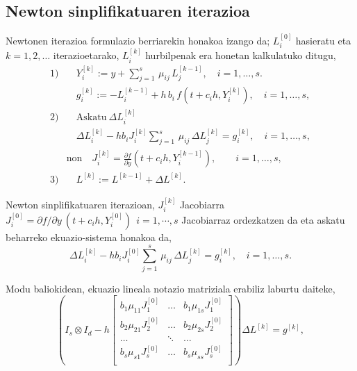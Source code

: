 \subsection*{Newton sinplifikatuaren iterazioa}

Newtonen iterazioa formulazio berriarekin honakoa izango da; $L_i^{[0]}$ hasieratu eta  $k=1,2,\dots$ iterazioetarako, $L_i^{[k]}$ hurbilpenak era honetan kalkulatuko ditugu,
\begin{equation}
\label{eq:Newton_iteration2}
\begin{split}
1) 
   & \quad Y_i^{[k]} := y+\sum_{j=1}^{s}\, \mu_{ij}\, L_{j}^{[k-1]}, \quad  i=1 ,\ldots, s. \\
   & \quad g_i^{[k]} := -L_{i}^{[k-1]}  + h \, b_i\, f(t+c_i h,  Y_i^{[k]}), \quad  i=1 ,\ldots, s, \\   
2) & \quad \mathrm{Askatu \ } \Delta L_{i}^{[k]}  \\
   & \quad \Delta L_{i}^{[k]}  - h b_i J_i^{[k]} \sum_{j=1}^{s}\, \mu_{ij} \, \Delta L_{j}^{[k]}=g_i^{[k]}, \quad  i=1 ,\ldots, s,  \\
& \mbox{non} \quad  J_i^{[k]}=\frac{\partial f}{\partial y}(t + c_i h,Y_{i}^{[k-1]}),\quad \quad  i=1,\ldots, s,  \\
3) 
   & \quad   L^{[k]} := L^{[k-1]}  + \Delta L^{[k]}.
   \end{split}
\end{equation}

Newton sinplifikatuaren iterazioan, $J_i^{[k]}$ Jacobiarra $J_i^{[0]}=\partial f / \partial y \ (t+c_ih, Y_i^{[0]}) \ \ i=1,\cdots,s$ Jacobiarraz ordezkatzen da eta askatu beharreko ekuazio-sistema honakoa da,
\begin{equation*}
\Delta L_{i}^{[k]}  - h b_i J_i^{[0]} \sum_{j=1}^{s}\, \mu_{ij} \, \Delta L_{j}^{[k]}=g_i^{[k]}, \quad  i=1 ,\ldots, s.
\end{equation*}

Modu baliokidean, ekuazio lineala notazio matriziala erabiliz laburtu daiteke,
\begin{equation*}
\left (I_s \otimes I_d - h  
\begin{bmatrix}
b_1 \mu_{11} J_1^{[0]} & \dots & b_1 \mu_{1s} J_1^{[0]} \\
b_2 \mu_{21} J_2^{[0]} & \dots & b_2 \mu_{2s} J_2^{[0]} \\
\dots          & \ddots & \dots \\
b_s \mu_{s1} J_s^{[0]} & \dots & b_s \mu_{ss} J_s^{[0]} \\ 
\end{bmatrix} \right) \Delta L^{[k]} =g^{[k]},
\end{equation*}

